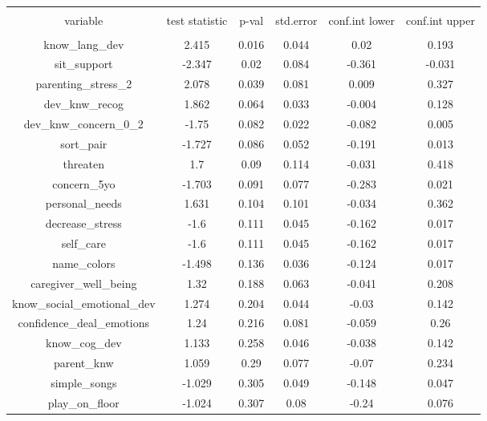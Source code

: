 
\begin{table}[!htbp] \centering 
  \caption{} 
  \label{tbl:treatment_baseline_imbalance_bulgaria} 
\begin{tabular}{@{\extracolsep{5pt}} cccccc} 
\\[-1.8ex]\hline 
\hline \\[-1.8ex] 
variable & test statistic & p-val & std.error & conf.int lower & conf.int upper \\ 
\hline \\[-1.8ex] 
know\_lang\_dev & 2.415 & 0.016 & 0.044 & 0.02 & 0.193 \\ 
sit\_support & -2.347 & 0.02 & 0.084 & -0.361 & -0.031 \\ 
parenting\_stress\_2 & 2.078 & 0.039 & 0.081 & 0.009 & 0.327 \\ 
dev\_knw\_recog & 1.862 & 0.064 & 0.033 & -0.004 & 0.128 \\ 
dev\_knw\_concern\_0\_2 & -1.75 & 0.082 & 0.022 & -0.082 & 0.005 \\ 
sort\_pair & -1.727 & 0.086 & 0.052 & -0.191 & 0.013 \\ 
threaten & 1.7 & 0.09 & 0.114 & -0.031 & 0.418 \\ 
concern\_5yo & -1.703 & 0.091 & 0.077 & -0.283 & 0.021 \\ 
personal\_needs & 1.631 & 0.104 & 0.101 & -0.034 & 0.362 \\ 
decrease\_stress & -1.6 & 0.111 & 0.045 & -0.162 & 0.017 \\ 
self\_care & -1.6 & 0.111 & 0.045 & -0.162 & 0.017 \\ 
name\_colors & -1.498 & 0.136 & 0.036 & -0.124 & 0.017 \\ 
caregiver\_well\_being & 1.32 & 0.188 & 0.063 & -0.041 & 0.208 \\ 
know\_social\_emotional\_dev & 1.274 & 0.204 & 0.044 & -0.03 & 0.142 \\ 
confidence\_deal\_emotions & 1.24 & 0.216 & 0.081 & -0.059 & 0.26 \\ 
know\_cog\_dev & 1.133 & 0.258 & 0.046 & -0.038 & 0.142 \\ 
parent\_knw & 1.059 & 0.29 & 0.077 & -0.07 & 0.234 \\ 
simple\_songs & -1.029 & 0.305 & 0.049 & -0.148 & 0.047 \\ 
play\_on\_floor & -1.024 & 0.307 & 0.08 & -0.24 & 0.076 \\ 

\end{tabular}
\end{table}

